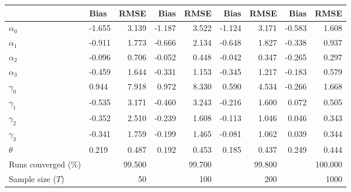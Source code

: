 
\begin{tabular}[t]{llrrrrrrr}
\toprule
  & Bias & RMSE & Bias & RMSE & Bias & RMSE & Bias & RMSE\\
\midrule
$\alpha_{0}$ & -1.655 & 3.139 & -1.187 & 3.522 & -1.124 & 3.171 & -0.583 & 1.608\\
$\alpha_{1}$ & -0.911 & 1.773 & -0.666 & 2.134 & -0.648 & 1.827 & -0.338 & 0.937\\
$\alpha_{2}$ & -0.096 & 0.706 & -0.052 & 0.448 & -0.042 & 0.347 & -0.265 & 0.297\\
$\alpha_{3}$ & -0.459 & 1.644 & -0.331 & 1.153 & -0.345 & 1.217 & -0.183 & 0.579\\
$\gamma_{0}$ & 0.944 & 7.918 & 0.972 & 8.330 & 0.590 & 4.534 & -0.266 & 1.668\\
$\gamma_{1}$ & -0.535 & 3.171 & -0.460 & 3.243 & -0.216 & 1.600 & 0.072 & 0.505\\
$\gamma_{2}$ & -0.352 & 2.510 & -0.239 & 1.608 & -0.113 & 1.046 & 0.046 & 0.343\\
$\gamma_{3}$ & -0.341 & 1.759 & -0.199 & 1.465 & -0.081 & 1.062 & 0.039 & 0.344\\
$\theta$ & 0.219 & 0.487 & 0.192 & 0.453 & 0.185 & 0.437 & 0.249 & 0.444\\
Runs converged (\%) &  & 99.500 &  & 99.700 &  & 99.800 &  & 100.000\\
Sample size ($T$) &  & 50 &  & 100 &  & 200 &  & 1000\\
\bottomrule
\end{tabular}
